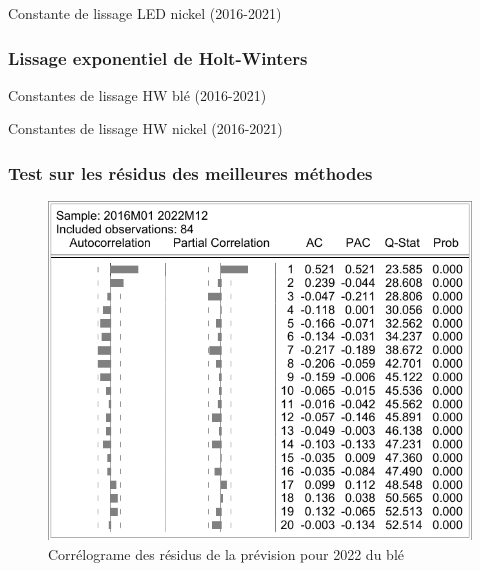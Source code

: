 \documentclass[12pt,a4paper]{article}
\begin{document}
\begin{table}[H]
    \centering
    \caption{Constante de lissage LED nickel (2016-2021)}
    \label{tab:led_nickel21}
    \sffamily
    \resizebox{0.55\textwidth}{!}{}
\end{table}

\subsubsection{Lissage exponentiel de Holt-Winters}\label{appendix:hw_21}
\begin{table}[H]
    \centering
    \caption{Constantes de lissage HW blé (2016-2021)}
    \label{tab:hw_ble}
    \sffamily
    \resizebox{0.55\textwidth}{!}{}
\end{table}
\begin{table}[H]
    \centering
    \caption{Constantes de lissage HW nickel (2016-2021)}
    \label{tab:hw_nickel}
    \sffamily
    \resizebox{0.55\textwidth}{!}{}
\end{table}
\clearpage
\subsubsection{Test sur les résidus des meilleures méthodes}\label{appendix:traditest}
\begin{figure}[H]
    \centering
    \includegraphics[]{annexe/3_2_2_cor_resid_ble.pdf}
    \caption{Corrélograme des résidus de la prévision pour 2022 du blé}
\end{figure}
\end{document}
